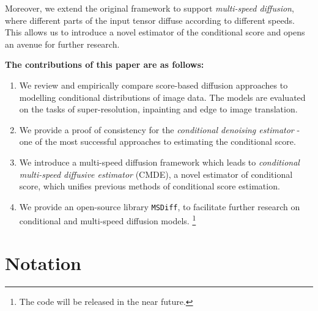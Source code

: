 Moreover, we extend the original framework to support \textit{multi-speed diffusion}, where different parts of the input tensor diffuse according to different speeds. This allows us to introduce a novel estimator of the conditional score and opens an avenue for further research.


\noindent
\textbf{The contributions of this paper are as follows:}
\begin{enumerate}
    \item We review and empirically compare score-based diffusion  approaches to modelling conditional distributions of image data. The models are evaluated on the tasks of super-resolution, inpainting and edge to image translation.
    \item We provide a proof of consistency for the \textit{conditional denoising estimator} - one of the most successful approaches to estimating the conditional score. 
    \item We introduce a multi-speed diffusion framework which leads to \textit{conditional multi-speed diffusive estimator} (CMDE), a novel estimator of conditional score, which unifies previous methods of conditional score estimation.
    \item We provide an open-source library \texttt{MSDiff}, to facilitate further research on conditional and multi-speed diffusion models. \footnote{The code will be released in the near future.}
\end{enumerate}

\section{Notation}

